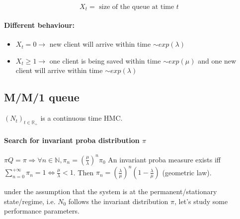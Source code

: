 \documentclass{article}
\begin{document}
\[X_t = \text{ size of the queue at time $t$}\]


\paragraph{Different behaviour:}
\begin{itemize}
\item $X_t=0 \to $ new client will arrive within time $\sim exp(\lambda)$
\item $X_t \geq 1 \to$ one client is being saved within time $\sim exp(\mu)$ and one new client will arrive within time $\sim exp(\lambda)$
\end{itemize}



\subsection{M/M/1 queue}

$(N_t)_{t\in \mathbb{R}_+}$ is a continuous time HMC.

\paragraph{Search for invariant proba distribution $\pi$}

$\pi Q=\pi \Rightarrow \forall n\in \mathbb{N}, \pi_n = \left( \frac{\mu}{\lambda}\right)^n\pi_0$
An invariant proba measure exists iff $\sum_{n=0}^{+\infty}\pi_n=1 \Leftrightarrow \frac{\mu}{\lambda}<1$. Then $\pi_n=\left(\frac{\lambda}{\mu}\right)^n \left(1-\frac{\lambda}{\mu}\right)$ (geometric law).

under the assumption that the system is at the permanent/stationary state/regime, i.e. $N_0$ follows the invariant distribution $\pi$, let's study some performance parameters.
\end{document}
